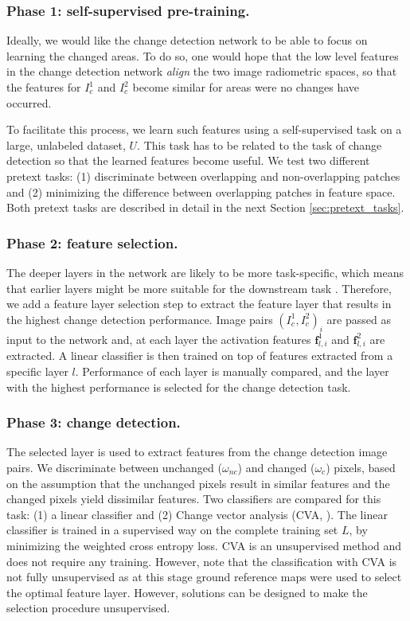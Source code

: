 \documentclass[runningheads]{llncs}
\begin{document}
\subsubsection{Phase 1: self-supervised pre-training.} Ideally, we would like the change detection network to be able to focus on learning the changed areas. To do so, one would hope that the low level features in the change detection network \emph{align} the two image radiometric spaces, so that
the {features} for $I_c^1$ and $I_c^2$ become similar for areas were no changes have occurred. 

To facilitate this process, we learn such features using a self-supervised task on a large, unlabeled dataset, $U$. {This task has to be related to the task of change detection so that the learned features become useful.}
We test two different pretext tasks:  (1) discriminate between overlapping and non-overlapping patches and (2) minimizing the  difference between overlapping patches in  feature space. Both pretext tasks are described in detail in the next Section \ref{sec:pretext_tasks}.

\subsubsection{Phase 2: feature selection.} 
The deeper layers in the network are likely to be more task-specific, which means that earlier layers might be more suitable for the downstream task \cite{Gidaris:2018:self-supervised_rotation}. Therefore, we add a feature layer selection step to extract the feature layer that results in the highest change detection performance. Image pairs $(I_c^1, I_c^2)_i$ are passed as input to the network and, at each layer the activation features $\mathbf{f}_{l,i}^1$ and $\mathbf{f}_{l,i}^2$ are extracted. {A linear classifier is} then trained on top of features extracted from a specific layer $l$. 
Performance of each layer is manually compared, and the layer with the highest performance is selected for the change detection task. 

\subsubsection{Phase 3: change detection.} 
The selected layer is used to extract features from the change detection image pairs. We discriminate between unchanged ($\omega_{nc}$) and changed ($\omega_c$) pixels, based on the assumption that the unchanged pixels result in similar features and the changed pixels yield dissimilar features. Two classifiers are compared for this task: (1) a linear classifier and (2) Change vector analysis ({CVA}, \cite{Bovolo:2015:time_cd}). The linear classifier is trained in a supervised way on the complete training set $L$, by minimizing the weighted cross entropy loss. {CVA} is an unsupervised method and does not require any training. However, note that the classification with {CVA} is not fully unsupervised as {at this stage} ground reference maps were used to select the optimal feature layer. {However, solutions can be designed to make the selection procedure unsupervised.}  \newline \newline 
\end{document}
